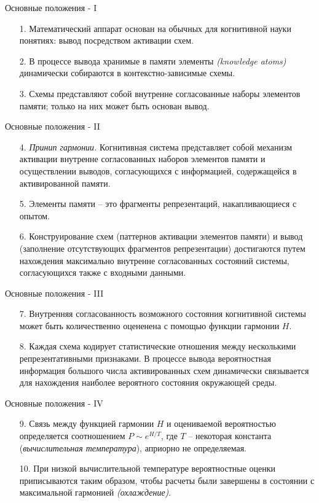 \documentclass{beamer}
\begin{document}
\begin{frame}{Основные положения - I}
\begin{itemize}
	\item[1.] Математический аппарат основан на обычных для когнитивной науки понятиях: вывод посредством активации схем.
	\medskip
	\item[2.] В процессе вывода хранимые в памяти элементы \textit{(knowledge atoms)} динамически собираются в контекстно-зависимые схемы.
	\medskip
	\item[3.] Схемы представляют собой внутренне согласованные наборы элементов памяти; только на них может быть основан вывод.
\end{itemize}
\end{frame}

\begin{frame}{Основные положения - II}
\begin{itemize}
	\item[4.] \textit{Принип гармонии.} Когнитивная система представляет собой механизм активации внутренне согласованных наборов элементов памяти и осуществлении выводов, согласующихся с информацией, содержащейся в активированной памяти.
	\medskip
	\item[5.] Элементы памяти -- это фрагменты репрезентаций, накапливающиеся с опытом.
	\medskip
	\item[6.] Конструирование схем (паттернов активации элементов памяти) и вывод (заполнение отсутствующих фрагментов репрезентации) достигаются путем нахождения максимально внутренне согласованных состояний системы, согласующихся также с входными данными.
\end{itemize}
\end{frame}

\begin{frame}{Основные положения - III}
\begin{itemize}
	\item[7.] Внутренняя согласованность возможного состояния когнитивной системы может быть количественно оцененена с помощью функции гармонии $H$.
	\medskip
	\item[8.] Каждая схема кодирует статистические отношения между несколькими репрезентативными признаками. В процессе вывода вероятностная информация большого числа активированных схем динамически связывается для нахождения наиболее вероятного состояния окружающей среды.
\end{itemize}
\end{frame}

\begin{frame}{Основные положения - IV}
\begin{itemize}
	\item[9.] Связь между функцией гармонии $H$ и оцениваемой вероятностью определяется соотношением $P \sim e^{H/T}$, где $T$ -- некоторая константа (\textit{вычислительная температура}), априорно не определяемая.
	\medskip	
	\item[10.] При низкой вычислительной температуре вероятностные оценки приписываются таким образом, чтобы расчеты были завершены в состоянии с максимальной гармонией \textit{(охлаждение)}.
\end{itemize}
\end{frame}
\end{document}
